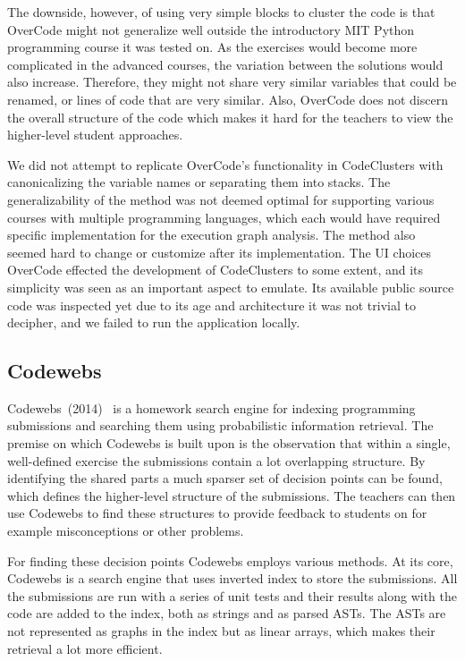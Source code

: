 The downside, however, of using very simple blocks to cluster the code is that OverCode might not generalize well outside the introductory MIT Python programming course it was tested on. As the exercises would become more complicated in the advanced courses, the variation between the solutions would also increase. Therefore, they might not share very similar variables that could be renamed, or lines of code that are very similar. Also, OverCode does not discern the overall structure of the code which makes it hard for the teachers to view the higher-level student approaches.

We did not attempt to replicate OverCode's functionality in CodeClusters with canonicalizing the variable names or separating them into stacks. The generalizability of the method was not deemed optimal for supporting various courses with multiple programming languages, which each would have required specific implementation for the execution graph analysis. The method also seemed hard to change or customize after its implementation. The UI choices OverCode effected the development of CodeClusters to some extent, and its simplicity was seen as an important aspect to emulate. Its available public source code was inspected yet due to its age and architecture it was not trivial to decipher, and we failed to run the application locally.

\subsection{Codewebs}
\label{ssec:codewebs}

Codewebs~(2014)~\cite{codewebs} is a homework search engine for indexing programming submissions and searching them using probabilistic information retrieval. The premise on which Codewebs is built upon is the observation that within a single, well-defined exercise the submissions contain a lot overlapping structure. By identifying the shared parts a much sparser set of decision points can be found, which defines the higher-level structure of the submissions. The teachers can then use Codewebs to find these structures to provide feedback to students on for example misconceptions or other problems.

For finding these decision points Codewebs employs various methods. At its core, Codewebs is a search engine that uses inverted index to store the submissions. All the submissions are run with a series of unit tests and their results along with the code are added to the index, both as strings and as parsed ASTs. The ASTs are not represented as graphs in the index but as linear arrays, which makes their retrieval a lot more efficient.

